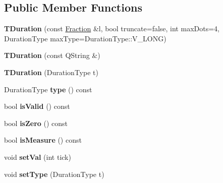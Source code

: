 \subsection*{Public Member Functions}
\begin{DoxyCompactItemize}
\item 
\mbox{\label{class_ms_1_1_t_duration_adb3faec4e8e5e9240dabbee9f64743a9}} 
{\bfseries T\+Duration} (const \hyperlink{class_ms_1_1_fraction}{Fraction} \&l, bool truncate=false, int max\+Dots=4, Duration\+Type max\+Type=Duration\+Type\+::\+V\+\_\+\+L\+O\+NG)
\item 
\mbox{\label{class_ms_1_1_t_duration_a129df212071da4adedd578a71f0992d5}} 
{\bfseries T\+Duration} (const Q\+String \&)
\item 
\mbox{\label{class_ms_1_1_t_duration_a110bb4a79c182b4456c3bcae3c227ee6}} 
{\bfseries T\+Duration} (Duration\+Type t)
\item 
\mbox{\label{class_ms_1_1_t_duration_a123168fe235332a63c716e041fc3ddd5}} 
Duration\+Type {\bfseries type} () const
\item 
\mbox{\label{class_ms_1_1_t_duration_a2535725d2eb2060f255dda68d6d62d8a}} 
bool {\bfseries is\+Valid} () const
\item 
\mbox{\label{class_ms_1_1_t_duration_a5bc114333d3029ce7b4f66f0f4486d76}} 
bool {\bfseries is\+Zero} () const
\item 
\mbox{\label{class_ms_1_1_t_duration_a477b8c2ea4cd1914e605219b70fb7b13}} 
bool {\bfseries is\+Measure} () const
\item 
\mbox{\label{class_ms_1_1_t_duration_a483e05e4243d28b0a2d263da4cb5b135}} 
void {\bfseries set\+Val} (int tick)
\item 
\mbox{\label{class_ms_1_1_t_duration_a5d60b0c53d2079c187f1b363aaac62a8}} 
void {\bfseries set\+Type} (Duration\+Type t)
\item 
\mbox{\label{class_ms_1_1_t_duration_ae78980e0f91d9cf4f5b692e96e56dea4}} 

\end{DoxyCompactItemize}
